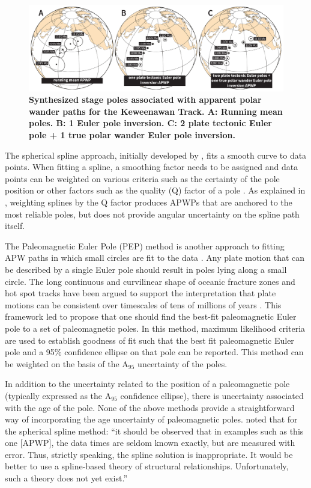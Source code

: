 \documentclass[11pt,letterpaper]{article}
\begin{document}
\begin{figure}
\includegraphics[width=\textwidth]{Figures/Fig9_mean_APWP.pdf}
\caption{\small{\textbf{Synthesized stage poles associated with apparent polar wander paths for the Keweenawan Track. A: Running mean poles. B: 1 Euler pole inversion. C: 2 plate tectonic Euler pole + 1 true polar wander Euler pole inversion.}}}
\label{fig:mean_APWP}
\end{figure}

The spherical spline approach, initially developed by \cite{Jupp1987a}, fits a smooth curve to data points. When fitting a spline, a smoothing factor needs to be assigned and data points can be weighted on various criteria such as the certainty of the pole position or other factors such as the quality (Q) factor of a pole \citep{Van-der-Voo1990a}. As explained in \cite{Torsvik2008a}, weighting splines by the Q factor produces APWPs that are anchored to the most reliable poles, but does not provide angular uncertainty on the spline path itself.

The Paleomagnetic Euler Pole (PEP) method is another approach to fitting APW paths in which small circles are fit to the data \citep{Gordon1984a}. Any plate motion that can be described by a single Euler pole should result in poles lying along a small circle. The long continuous and curvilinear shape of oceanic fracture zones and hot spot tracks have been argued to support the interpretation that plate motions can be consistent over timescales of tens of millions of years \citep{Gordon1984a, Tarling1996a}. This framework led \cite{Gordon1984a} to propose that one should find the best-fit paleomagnetic Euler pole to a set of paleomagnetic poles. In this method, maximum likelihood criteria are used to establish goodness of fit such that the best fit paleomagnetic Euler pole and a 95$\%$ confidence ellipse on that pole can be reported. This method can be weighted on the basis of the A$_{95}$ uncertainty of the poles.

In addition to the uncertainty related to the position of a paleomagnetic pole (typically expressed as the A$_{95}$ confidence ellipse), there is uncertainty associated with the age of the pole. None of the above methods provide a straightforward way of incorporating the age uncertainty of paleomagnetic poles. \cite{Jupp1987a} noted that for the spherical spline method: ``it should be observed that in examples such as this one [APWP], the data times are seldom known exactly, but are measured with error. Thus, strictly speaking, the spline solution is inappropriate. It would be better to use a spline-based theory of structural relationships. Unfortunately, such a theory does not yet exist.''
\end{document}
